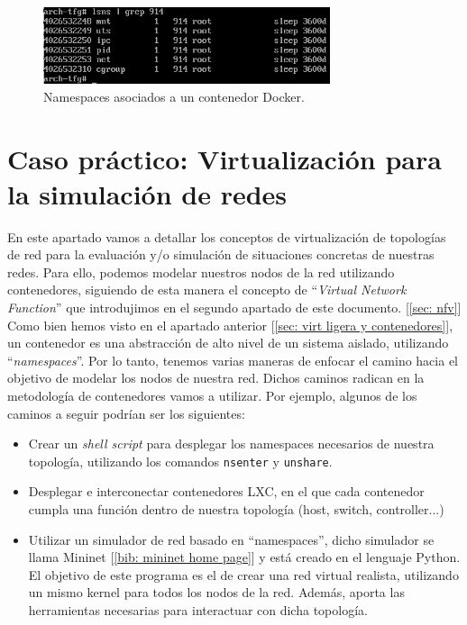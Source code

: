 \documentclass[a4paper, oneside, 12pt]{book}
\begin{document}
	\begin{figure}[h!]
		\begin{center}
			\includegraphics[width=0.75\textwidth]{img/docker_ns5.png}
			\caption{Namespaces asociados a un contenedor Docker.}
		\end{center}
	\end{figure}
	
	\pagebreak

	\chapter{Caso práctico: Virtualización para la simulación de redes}
	
	\noindent En este apartado vamos a detallar los conceptos de virtualización de topologías de red para la evaluación y/o simulación de situaciones concretas de nuestras redes. Para ello, podemos modelar nuestros nodos de la red utilizando contenedores, siguiendo de esta manera el concepto de ``\textit{Virtual Network Function}'' que introdujimos en el segundo apartado de este documento. [\ref{sec: nfv}] \\
	
	\noindent Como bien hemos visto en el apartado anterior [\ref{sec: virt ligera y contenedores}], un contenedor es una abstracción de alto nivel de un sistema aislado, utilizando ``\textit{namespaces}''. Por lo tanto, tenemos varias maneras de enfocar el camino hacia el objetivo de modelar los nodos de nuestra red. Dichos caminos radican en la metodología de contenedores vamos a utilizar. Por ejemplo, algunos de los caminos a seguir podrían ser los siguientes:
	
	\begin{itemize}
		\item Crear un \textit{shell script} para desplegar los namespaces necesarios de nuestra topología, utilizando los comandos \texttt{nsenter} y \texttt{unshare}.
		\item Desplegar e interconectar contenedores LXC, en el que cada contenedor cumpla una función dentro de nuestra topología (host, switch, controller...)
		\item Utilizar un simulador de red basado en ``namespaces'', dicho simulador se llama Mininet [\ref{bib: mininet home page}] y está creado en el lenguaje Python. El objetivo de este programa es el de crear una red virtual realista, utilizando un mismo kernel para todos los nodos de la red. Además, aporta las herramientas necesarias para interactuar con dicha topología.
	\end{itemize}
	
\end{document}
